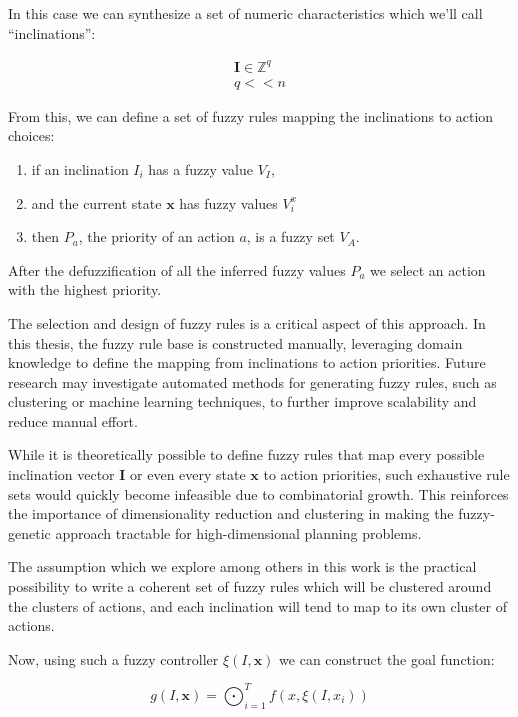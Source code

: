 \documentclass[12pt, a4paper]{report}
\begin{document}
	In this case we can synthesize a set of numeric characteristics which we'll call ``inclinations'':
	
	\begin{eqnarray}
		\mathbf{I} \in \mathbb{Z}^q\\
		q << n \label{q<<n}
	\end{eqnarray}

	From this, we can define a set of fuzzy rules\cite{ray2014softcomputing} mapping the inclinations to action choices:

	\begin{enumerate}
		\item if an inclination $I_i$ has a fuzzy value $V_I$,
		\item and the current state $\mathbf{x}$ has fuzzy values $V^x_i$
		\item then $P_a$, the priority of an action $a$, is a fuzzy set $V_A$.
	\end{enumerate}
	
	After the defuzzification of all the inferred fuzzy values $P_a$ we select an action with the highest priority.
	
	The selection and design of fuzzy rules is a critical aspect of this approach.
	In this thesis, the fuzzy rule base is constructed manually, leveraging domain knowledge to define the mapping from inclinations to action priorities.
	Future research may investigate automated methods for generating fuzzy rules, such as clustering or machine learning techniques, to further improve scalability and reduce manual effort.

	While it is theoretically possible to define fuzzy rules that map every possible inclination vector $\mathbf{I}$ or even every state $\mathbf{x}$ to action priorities, such exhaustive rule sets would quickly become infeasible due to combinatorial growth.
	This reinforces the importance of dimensionality reduction and clustering in making the fuzzy-genetic approach tractable for high-dimensional planning problems.

	The assumption which we explore among others in this work is the practical possibility to write a coherent set of fuzzy rules which will be clustered around the clusters of actions, and each inclination will tend to map to its own cluster of actions.
	
	Now, using such a fuzzy controller $\xi(I, \mathbf{x})$ we can construct the goal function:
	
	\begin{equation}\label{definitions:goal-function}
		g(I, \mathbf{x}) = \bigodot_{i=1}^{T} f(x, \xi(I, x_i))
	\end{equation}
	
\end{document}
